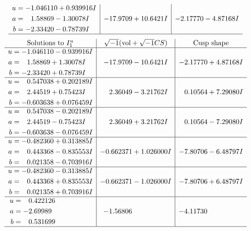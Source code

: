 \documentclass[1p]{elsarticle_modified}
\theoremstyle{definition}
\newcommand{\I}{\sqrt{-1}}
\begin{document}
$$\begin{array}{c|c|c}
\begin{aligned}
u &= -1.046110 + 0.939916 I \\
a &= \phantom{-}1.58869 - 1.30078 I \\
b &= -2.33420 - 0.78739 I\end{aligned}
 & -17.9709 + 10.6421 I & -2.17770 - 4.87168 I\\
 \hline 
 \end{array}$$\newpage$$\begin{array}{c|c|c}  
\text{Solutions to }I^u_{1}& \I (\text{vol} + \sqrt{-1}CS) & \text{Cusp shape}\\
 \hline 
\begin{aligned}
u &= -1.046110 - 0.939916 I \\
a &= \phantom{-}1.58869 + 1.30078 I \\
b &= -2.33420 + 0.78739 I\end{aligned}
 & -17.9709 - 10.6421 I & -2.17770 + 4.87168 I \\ \hline\begin{aligned}
u &= \phantom{-}0.547038 + 0.202189 I \\
a &= \phantom{-}2.44519 + 0.75423 I \\
b &= -0.603638 + 0.076459 I\end{aligned}
 & \phantom{-}2.36049 - 3.21762 I & \phantom{-}0.10564 + 7.29080 I \\ \hline\begin{aligned}
u &= \phantom{-}0.547038 - 0.202189 I \\
a &= \phantom{-}2.44519 - 0.75423 I \\
b &= -0.603638 - 0.076459 I\end{aligned}
 & \phantom{-}2.36049 + 3.21762 I & \phantom{-}0.10564 - 7.29080 I \\ \hline\begin{aligned}
u &= -0.482360 + 0.313885 I \\
a &= \phantom{-}0.443368 - 0.835553 I \\
b &= \phantom{-}0.021358 - 0.703916 I\end{aligned}
 & -0.662371 + 1.026000 I & -7.80706 - 6.48797 I \\ \hline\begin{aligned}
u &= -0.482360 - 0.313885 I \\
a &= \phantom{-}0.443368 + 0.835553 I \\
b &= \phantom{-}0.021358 + 0.703916 I\end{aligned}
 & -0.662371 - 1.026000 I & -7.80706 + 6.48797 I \\ \hline\begin{aligned}
u &= \phantom{-}0.422126\phantom{ +0.000000I} \\
a &= -2.69989\phantom{ +0.000000I} \\
b &= \phantom{-}0.531699\phantom{ +0.000000I}\end{aligned}
 & -1.56806\phantom{ +0.000000I} & -4.11730\phantom{ +0.000000I}\\
 \hline 
 \end{array}$$\newpage\newpage\renewcommand{\arraystretch}{1}
\end{document}
